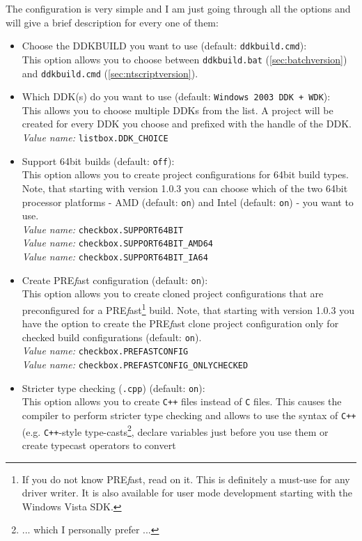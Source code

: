 \documentclass[a4paper,titlepage]{report}
\newcommand{\default}[1]{\textcolor[gray]{0.40}{(default: \texttt{#1})}}
\newcommand{\option}[1]{\textcolor[rgb]{0.00,0.20,0.20}{\textsf{#1}}}
\newcommand{\optiondeco}[1]{#1\vspace{0.1cm}}
\newcommand{\inioption}[1]{\\\textcolor[rgb]{0.00,0.00,0.40}{\textsl{Value name:} \texttt{#1}}}
\newcommand{\prefast}[0]{\textsf{PRE\textsl{f}ast}}
\begin{document}
The configuration is very simple and I am just going through all the
options and will give a brief description for every one of them:
\begin{itemize}
  \item \optiondeco{\option{Choose the DDKBUILD you want to use} \default{ddkbuild.cmd}:}\\
  This option allows you to choose between \texttt{ddkbuild.bat} (\autoref{sec:batchversion})
  and \texttt{ddkbuild.cmd} (\autoref{sec:ntscriptversion}).
  \item \optiondeco{\option{Which DDK(s) do you want to use} \default{Windows 2003 DDK + WDK}:}\\
  This allows you to choose multiple DDKs from the list.
  A project will be created for every DDK you choose and prefixed with
  the handle of the DDK.
  \inioption{listbox.DDK\_CHOICE}
  \item \optiondeco{\option{Support 64bit builds} \default{off}:}\\
  This option allows you to create project configurations for
  64bit build types.
  Note, that starting with version 1.0.3 you can choose which of the two 64bit
  processor platforms - AMD \default{on} and Intel \default{on} - you want to use.
  \inioption{checkbox.SUPPORT64BIT}
  \inioption{checkbox.SUPPORT64BIT\_AMD64}
  \inioption{checkbox.SUPPORT64BIT\_IA64}
  \item \optiondeco{\option{Create \prefast{} configuration} \default{on}:}\\
  This option allows you to create cloned project configurations that
  are preconfigured for a \prefast{}\footnote{If you do not know \prefast{}, read on it.
  This is definitely a must-use for any driver writer. It is also available
  for user mode development starting with the Windows Vista SDK.} build.
  Note, that starting with version 1.0.3 you have the option to create the \prefast{}
  clone project configuration only for checked build configurations \default{on}.
  \inioption{checkbox.PREFASTCONFIG}
  \inioption{checkbox.PREFASTCONFIG\_ONLYCHECKED}
  \item \optiondeco{\option{Stricter type checking (\texttt{.cpp})} \default{on}:}\\
  This option allows you to create \texttt{C++} files instead of \texttt{C} files.
  This causes the compiler to perform stricter type checking and
  allows to use the syntax of \texttt{C++} (e.g. \texttt{C++}-style
  type-casts\footnote{... which I personally prefer ...}, declare
  variables just before you use them or create typecast operators to convert

\end{itemize}
\end{document}
